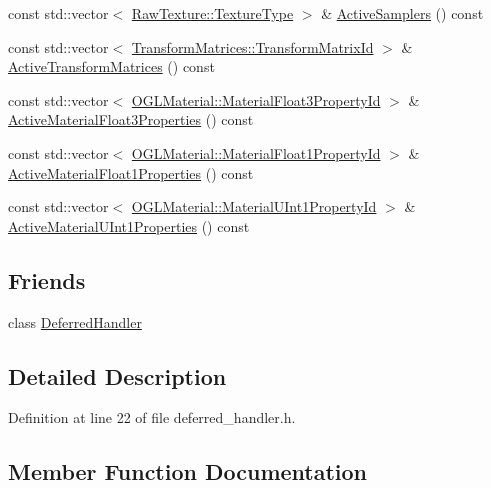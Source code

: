\begin{DoxyCompactItemize}
\item 
const std\+::vector$<$ \hyperlink{class_raw_texture_ac0eafe7206f7f38aeb4e8e5631480f6d}{Raw\+Texture\+::\+Texture\+Type} $>$ \& \hyperlink{class_deferred_program_a8ec118f5400a64f371379f736d614087}{Active\+Samplers} () const 
\item 
const std\+::vector$<$ \hyperlink{class_transform_matrices_ac0c0f9ab5279bfd44b4c1fd97f041521}{Transform\+Matrices\+::\+Transform\+Matrix\+Id} $>$ \& \hyperlink{class_deferred_program_aa612a1908d16c85da946f4daadfca27c}{Active\+Transform\+Matrices} () const 
\item 
const std\+::vector$<$ \hyperlink{class_o_g_l_material_a1fc530fc808e270be78c8b296abed0ce}{O\+G\+L\+Material\+::\+Material\+Float3\+Property\+Id} $>$ \& \hyperlink{class_deferred_program_abec83e45d38efd5812bfefc3a75e9ceb}{Active\+Material\+Float3\+Properties} () const 
\item 
const std\+::vector$<$ \hyperlink{class_o_g_l_material_a27506550fa395365703eb941e525e64c}{O\+G\+L\+Material\+::\+Material\+Float1\+Property\+Id} $>$ \& \hyperlink{class_deferred_program_ac95773b10a5ba4dc213f423ee68b22f8}{Active\+Material\+Float1\+Properties} () const 
\item 
const std\+::vector$<$ \hyperlink{class_o_g_l_material_a79448ba294d1923d56ebca495b0c272e}{O\+G\+L\+Material\+::\+Material\+U\+Int1\+Property\+Id} $>$ \& \hyperlink{class_deferred_program_aad80369559581e0fc6cce20ad2121d26}{Active\+Material\+U\+Int1\+Properties} () const 
\end{DoxyCompactItemize}
\subsection*{Friends}
\begin{DoxyCompactItemize}
\item 
class \hyperlink{class_deferred_program_abb5b497d17b5687404e06c7d1390b4f8}{Deferred\+Handler}
\end{DoxyCompactItemize}


\subsection{Detailed Description}


Definition at line 22 of file deferred\+\_\+handler.\+h.



\subsection{Member Function Documentation}
\hypertarget{class_deferred_program_ac95773b10a5ba4dc213f423ee68b22f8}{}
